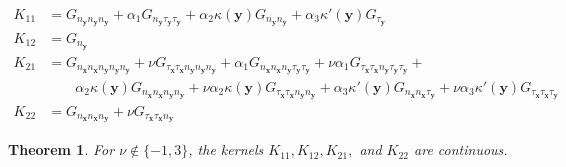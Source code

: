 \documentclass[preprint,12pt,3p]{elsarticle}
\newtheorem{thm}{Theorem}
\begin{document}
\begin{align}
    K_{11} &= G_{n_\mathbf{y} n_\mathbf{y} n_\mathbf{y}}   + \alpha_1 G_{n_\mathbf{y} \tau_\mathbf{y} \tau_\mathbf{y}}  +  \alpha_2 \kappa(\mathbf{y}) G_{n_\mathbf{y} n_\mathbf{y} } + \alpha_3 \kappa'(\mathbf{y}) G_{\tau_\mathbf{y} }  \\
    K_{12} &= G_{n_{\mathbf{y}}} \\
    K_{21} &=  G_{n_\mathbf{x} n_\mathbf{x} n_\mathbf{y} n_\mathbf{y} n_\mathbf{y}} + \nu  G_{\tau_\mathbf{x} \tau_\mathbf{x} n_\mathbf{y} n_\mathbf{y} n_\mathbf{y}}   + \alpha_1 G_{ n_\mathbf{x} n_\mathbf{x} n_\mathbf{y} \tau_\mathbf{y} \tau_\mathbf{y}} + \nu  \alpha_1 G_{\tau_\mathbf{x} \tau_\mathbf{x} n_\mathbf{y} \tau_\mathbf{y} \tau_\mathbf{y}} + \nonumber  \\
    & \qquad  \alpha_2 \kappa(\mathbf{y}) G_{n_\mathbf{x} n_\mathbf{x} n_\mathbf{y} n_\mathbf{y} } +\nu \alpha_2 \kappa(\mathbf{y}) G_{\tau_\mathbf{x} \tau_\mathbf{x} n_\mathbf{y} n_\mathbf{y} } + \alpha_3 \kappa'(\mathbf{y}) G_{n_\mathbf{x} n_\mathbf{x} \tau_\mathbf{y} } + \nu \alpha_3 \kappa'(\mathbf{y}) G_{\tau_\mathbf{x} \tau_\mathbf{x} \tau_\mathbf{y} }  \\
    K_{22} &= G_{n_\mathbf{x} n_\mathbf{x} n_{\mathbf{y}}}  + \nu  G_{\tau_\mathbf{x} \tau_\mathbf{x} n_{\mathbf{y}}}  \label{last_supported_kernel}
\end{align}
\begin{thm}
For $\nu \notin \{-1, 3\}$, the kernels $K_{11},K_{12},K_{21},$ and $K_{22}$  are continuous. \label{supportedsmooth}
\end{thm}
\end{document}

